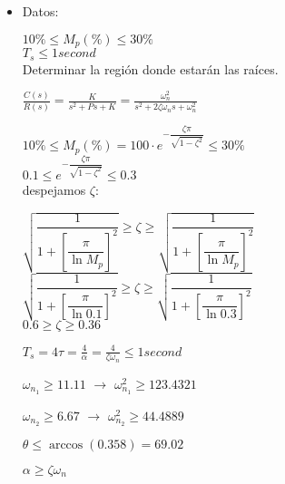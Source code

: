 \documentclass[12pt]{article}
\begin{document}
\begin{enumerate}
    \begin{itemize}
      \item Datos:

        \( \displaystyle 10\% \leq M_{p}(\%) \leq 30\% \)\\
        \( \displaystyle T_{s} \leq 1 second \)\\
        Determinar la regi\'on donde estar\'an las ra\'ices.

    \vspace{1cm}

    \( \displaystyle \frac{C(s)}{R(s)} = \frac{K}{s^2 + Ps + K} = \frac{\omega_{n}^{2}}{s^2 + 2\zeta \omega_{n}s + \omega_{n}^{2}} \)

    \( \displaystyle 10\% \leq M_p(\%) = 100\cdot e^{- \dfrac{\zeta \pi}{\sqrt{1 - \zeta^{2}}}} \leq 30\% \)\\
    
    \( \displaystyle 0.1 \leq e^{- \dfrac{\zeta \pi}{\sqrt{1 - \zeta^{2}}}} \leq 0.3 \)\\
    
    despejamos $\zeta$:

    \( \displaystyle \sqrt{\dfrac{1}{1+ \left [ \dfrac{\pi}{\ln{M_{p}}} \right ]^{2} }} \geq \zeta \geq \sqrt{\dfrac{1}{1+ \left [ \dfrac{\pi}{\ln{M_{p}}} \right ]^{2} }}\)\\
    
    \( \displaystyle \sqrt{\dfrac{1}{1+ \left [ \dfrac{\pi}{\ln{0.1}} \right ]^{2} }} \geq \zeta \geq \sqrt{\dfrac{1}{1+ \left [ \dfrac{\pi}{\ln{0.3}} \right ]^{2} }}\)\\
    
    \(\displaystyle 0.6 \geq \zeta \geq 0.36 \)

    \vspace{1cm}

    \( \displaystyle T_{s}=4\tau=\frac{4}{\alpha}=\frac{4}{\zeta \omega_{n}} \leq 1second \)

        $\omega_{n_{1}} \geq 11.11$ $\rightarrow$ $\omega_{n_{1}}^{2} \geq 123.4321$
        
        $\omega_{n_{2}} \geq 6.67$ $\rightarrow$ $\omega_{n_{2}}^{2} \geq 44.4889$
      
    \vspace{0.5cm}

    $\theta \leq \arccos{(0.358)} =69.02$

    \vspace{0.5cm}

    $\alpha \geq \zeta \omega_{n}$


\end{itemize}
\end{enumerate}
\end{document}
